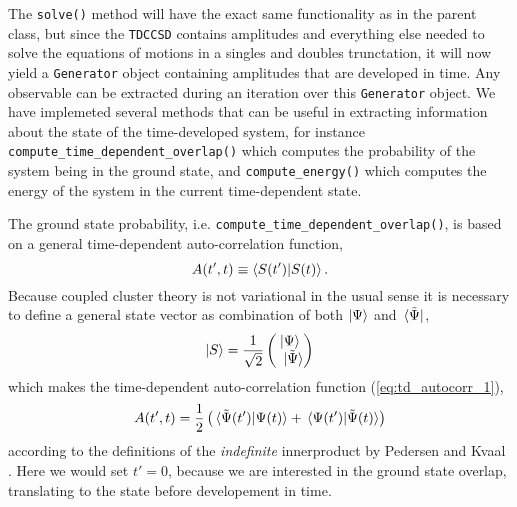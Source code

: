     The \lstinline{solve()} method will have the exact same functionality as in the parent class,
    but since the \lstinline{TDCCSD} contains amplitudes and everything else needed to 
    solve the equations of motions in a singles and doubles trunctation, it will now yield a 
    \lstinline{Generator} object 
    containing amplitudes that are developed in time. Any observable can be extracted during 
    an iteration over this \lstinline{Generator} object. We have implemeted several methods that 
    can be useful in extracting information about the state of the time-developed system,
    for instance \lstinline{compute_time_dependent_overlap()} which computes the 
    probability of the system being in the ground state, and \lstinline{compute_energy()} 
    which computes the energy of the system in the current time-dependent state.

    The ground state probability, i.e. \lstinline{compute_time_dependent_overlap()}, is 
    based on a general time-dependent auto-correlation function,
    \begin{equation}
        \label{eq:td_autocorr_1}
        A(t', t) \equiv \braket{S(t')}{S(t)}.
    \end{equation}
    Because coupled cluster theory is not variational in the usual sense it is necessary to 
    define a general state vector as combination of both $\ket{\Psi}$ and $\bra*{\tilde{\Psi}}$,
    \begin{equation}
        \ket{S} = \frac{1}{\sqrt{2}} \begin{pmatrix}
            \ket{\Psi} \\ \ket*{\tilde{\Psi}}
        \end{pmatrix}
    \end{equation}
    which makes the time-dependent auto-correlation function (\autoref{eq:td_autocorr_1}),
    \begin{equation}
        A(t', t) = \frac{1}{2} 
        \left( \braket*{\tilde{\Psi}(t')}{\Psi(t)} 
            +  \braket*{\Psi(t')}{\tilde{\Psi}(t)}  \right)
    \end{equation}
    according to the definitions of the \emph{indefinite} innerproduct by
    Pedersen and Kvaal \cite{pedersen2019symplectic}. 
    Here we would set $t'=0$, because we are
    interested in the ground state overlap, translating to the state before developement 
    in time.

